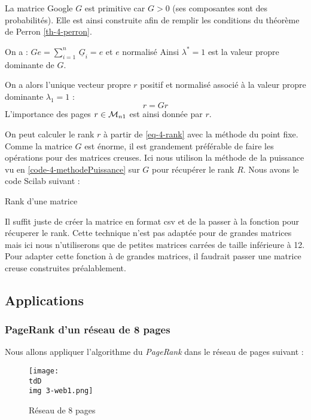 		La matrice Google $G$ est primitive car $G>0$ (ses composantes sont des probabilités). Elle est ainsi construite afin de remplir les conditions du théorème de Perron \eqref{th-4-perron}.

		On a : $Ge = \sum_{i=1}^n \, \underline{G}_i = e$ et $e$ normalisé
		Ainsi $\lambda^* = 1$ est la valeur propre dominante de $G$.


		On a alors l'unique vecteur propre $r$ positif et normalisé associé à la valeur propre dominante $\lambda_1 = 1$ :
		\begin{equation}
			\label{eq-4-rank}
			r = Gr
		\end{equation}
		L'importance des pages $r\in\mathcal{M}_{n1}$ est ainsi donnée par $r$.


		On peut calculer le rank $r$ à partir de \eqref{eq-4-rank} avec la méthode du point fixe. Comme la matrice $G$ est énorme, il est grandement préférable de faire les opérations pour des matrices creuses. Ici nous utilison la méthode de la puissance vu en \ref{code-4-methodePuissance} sur $G$ pour récupérer le rank $R$.
		Nous avons le code Scilab suivant :

		\begin{listing}[H]
			\caption{Rank d'une matrice}
			\label{code-4-Rank}
		\end{listing}

		Il suffit juste de créer la matrice en format csv et de la passer à la fonction pour récuperer le rank. Cette technique n'est pas adaptée pour de grandes matrices mais ici nous n'utiliserons que de petites matrices carrées de taille inférieure à 12.
		Pour adapter cette fonction à de grandes matrices, il faudrait passer une matrice creuse construites préalablement.		


	\subsection{Applications}

		\subsubsection{PageRank d'un réseau de 8 pages}

			Nous allons appliquer l'algorithme du \emph{PageRank} dans le réseau de pages suivant :

			\begin{figure}[H]
				\centering
				\texttt{[image: \\tdD\\img 3-web1.png]}
				\caption{Réseau de 8 pages}
				\label{img-4-web1}
			\end{figure}

